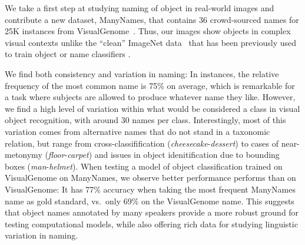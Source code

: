We take a first step at studying naming of object in real-world images and contribute a new dataset, ManyNames, that contains 36 crowd-sourced names for 25K instances from VisualGenome~\cite{krishna2016visualgenome}.
Thus, our images show objects in complex visual contexts
unlike the ``clean'' ImageNet data~\cite{imagenet_cvpr09} that has been previously used to train object or name classifiers \cite{Ordonez:2016}.

We find both consistency and variation in naming: In instances, the relative frequency of the most common name is 75\% on average, which is remarkable for a task where subjects are allowed to produce whatever name they like.
However, 
we find a high level of variation within what would be considered a class in visual object recognition, with around 30 names per class.
Interestingly, most of this variation comes from alternative names that do not stand in a taxonomic relation, but range from 
cross-classifification  (\textit{cheesecake}-\textit{dessert}) to cases
of near-metonymy (\textit{floor}-\textit{carpet}) and issues in object idenitification due to bounding boxes (\textit{man}-\textit{helmet}).
When testing a model of object classification trained on VisualGenome on ManyNames, we observe  better performance performs than on VisualGenome: It has 77\% accuracy when taking the most frequent ManyNames name as gold standard, vs.\ only 69\% on the VisualGenome name.
This suggests that object names annotated by many speakers provide a more robust ground for testing computational models, while also offering rich data for studying linguistic variation in naming.

